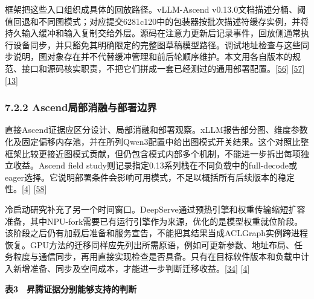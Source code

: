 \documentclass[
  11pt,
  UTF8]{ctexart}
\begin{document}
框架把这些入口组织成具体的回放路径。vLLM-Ascend
v0.13.0文档描述分桶、阈值回退和不同图模式；对应提交6281c120中的包装器按批次描述符缓存实例，并将持久输入缓冲和输入复制交给外层。源码在注意力更新后记录事件，回放侧通常执行设备同步，并只豁免其明确限定的完整图草稿模型路径。调试地址检查与这些同步说明，图对象存在并不代替缓冲管理和前后轮顺序维护。本文用各自版本的规范、接口和源码核实职责，不把它们拼成一套已经测过的通用部署配置。{[}\protect\hyperlink{ref-vllmascend0130}{56}{]}
{[}\protect\hyperlink{ref-vllmascend0130impl}{57}{]}
{[}\protect\hyperlink{ref-cann910update}{13}{]}

\hypertarget{section-7-2-2}{%
\subsubsection{7.2.2 Ascend局部消融与部署边界}\label{section-7-2-2}}

直接Ascend证据应区分设计、局部消融和部署观察。xLLM报告部分图、维度参数化及固定偏移内存池，并在所列Qwen3配置中给出图模式开关结果。这个对照比整框架比较更接近图模式贡献，但仍包含模式内部多个机制，不能进一步拆出每项独立收益。Ascend
field
study则记录指定0.13系列栈在不同负载中的full-decode或eager选择。它说明部署条件会影响可用模式，不足以概括所有后续版本的稳定性。{[}\protect\hyperlink{ref-liu2025xllm}{4}{]}
{[}\protect\hyperlink{ref-yu2026ascendfield}{58}{]}

冷启动研究补充了另一个时间窗口。DeepServe通过预热引擎和权重传输缩短扩容准备，其中NPU-fork需要已有运行引擎作为来源，优化的是模型权重就位阶段。该阶段之后仍有加载后准备和服务宣告，不能把其结果当成ACLGraph实例跨进程恢复。GPU方法的迁移同样应先列出所需原语，例如可更新参数、地址布局、任务粒度与通信同步，再用直接实现检查是否具备。只有在目标软件版本和负载中计入新增准备、同步及空间成本，才能进一步判断迁移收益。{[}\protect\hyperlink{ref-hu2025deepserve}{34}{]}
{[}\protect\hyperlink{ref-liu2025xllm}{4}{]}

\textbf{表3　昇腾证据分别能够支持的判断}
\end{document}
